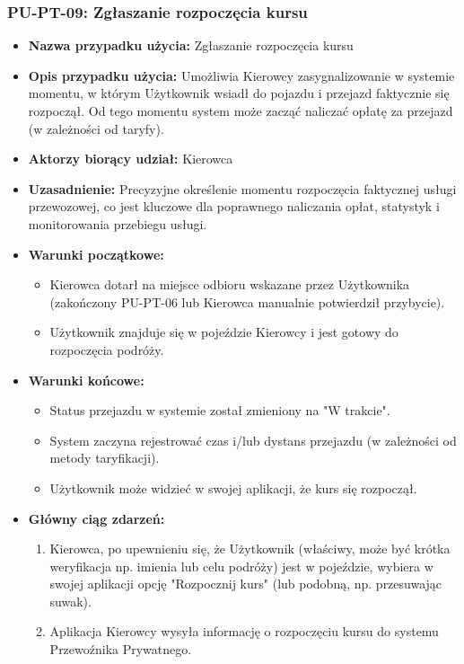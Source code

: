 \documentclass[a4paper,12pt]{article}
\begin{document}
\subsubsection{PU-PT-09: Zgłaszanie rozpoczęcia kursu}
\begin{itemize}
    \item \textbf{Nazwa przypadku użycia:} Zgłaszanie rozpoczęcia kursu
    \item \textbf{Opis przypadku użycia:} Umożliwia Kierowcy zasygnalizowanie w systemie momentu, w którym Użytkownik wsiadł do pojazdu i przejazd faktycznie się rozpoczął. Od tego momentu system może zacząć naliczać opłatę za przejazd (w zależności od taryfy).
    \item \textbf{Aktorzy biorący udział:} Kierowca
    \item \textbf{Uzasadnienie:} Precyzyjne określenie momentu rozpoczęcia faktycznej usługi przewozowej, co jest kluczowe dla poprawnego naliczania opłat, statystyk i monitorowania przebiegu usługi.
    \item \textbf{Warunki początkowe:}
        \begin{itemize}
            \item Kierowca dotarł na miejsce odbioru wskazane przez Użytkownika (zakończony PU-PT-06 lub Kierowca manualnie potwierdził przybycie).
            \item Użytkownik znajduje się w pojeździe Kierowcy i jest gotowy do rozpoczęcia podróży.
        \end{itemize}
    \item \textbf{Warunki końcowe:}
        \begin{itemize}
            \item Status przejazdu w systemie został zmieniony na "W trakcie".
            \item System zaczyna rejestrować czas i/lub dystans przejazdu (w zależności od metody taryfikacji).
            \item Użytkownik może widzieć w swojej aplikacji, że kurs się rozpoczął.
        \end{itemize}
    \item \textbf{Główny ciąg zdarzeń:}
        \begin{enumerate}
            \item Kierowca, po upewnieniu się, że Użytkownik (właściwy, może być krótka weryfikacja np. imienia lub celu podróży) jest w pojeździe, wybiera w swojej aplikacji opcję "Rozpocznij kurs" (lub podobną, np. przesuwając suwak).
            \item Aplikacja Kierowcy wysyła informację o rozpoczęciu kursu do systemu Przewoźnika Prywatnego.

\end{enumerate}
\end{itemize}
\end{document}

